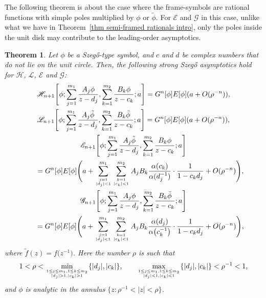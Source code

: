 \documentclass[pdftex]{sigma}
\numberwithin{equation}{section}
\newtheorem{Theorem}{Theorem}[section]
\newcommand{\al}{\alpha}
\newcommand{\di}{\displaystyle}
\begin{document}
	The following theorem is about the case where the frame-symbols are rational functions with simple poles multiplied by $\phi$ or $\tilde{\phi}$. For $\mathscr{E}$ and $\mathscr{G}$ in this case, unlike what we have in Theorem~\ref{thm semi-framed rationals intro}, only the poles inside the unit disk may contribute to the leading-order asymptotics.
	\begin{Theorem}\label{thm semi-framed rationals . phi intro} Let $\phi$ be a Szeg\H{o}-type symbol, and $c$ and $d$ be complex numbers that do not lie on the unit circle. Then, the following strong Szeg\H{o} asymptotics hold for $\mathscr{H}$, $\mathscr{L}$, $\mathscr{E}$ and $\mathscr{G}$:
		\begin{gather}
			\mathscr{H}_{n+1}\Bigg[\phi; \di \sum_{j=1}^{m_1} \di \frac{A_j \phi}{z-d_j}, \sum_{k=1}^{m_2} \di \frac{B_k\phi}{z-c_k};a\Bigg] = G^n[\phi] E[\phi] (a + O(\rho^{-n})),\label{asymp H rationals lin comb1}	
\\
			\mathscr{L}_{n+1}\Bigg[\phi; \di \sum_{j=1}^{m_1} \di \frac{A_j\tilde{\phi}}{z-d_j}, \sum_{k=1}^{m_2} \di \frac{B_k\tilde{\phi}}{z-c_k};a\Bigg] = G^n[\phi] E[\phi] (a + O(\rho^{-n})),	\nonumber
\\
			\mathscr{E}_{n+1}\Bigg[\phi; \di \sum_{j=1}^{m_1} \di \frac{A_j\tilde{\phi}}{z-d_j}, \sum_{k=1}^{m_2} \di \frac{B_k\phi}{z-c_k};a\Bigg] \nonumber
\\ \qquad= G^n[\phi] E[\phi] \Bigg( a + \sum^{m_1}_{j=1 \atop |d_j|<1 } \sum^{m_2}_{k=1 \atop |c_k|<1 } A_jB_k \frac{\al(c_k)}{\al(d_j^{-1})}\cdot \frac{1}{1-c_kd_j} +O(\rho^{-n}) \Bigg),	\nonumber
\\
			\mathscr{G}_{n+1}\Bigg[\phi; \di \sum_{j=1}^{m_1} \di \frac{A_j\phi}{z-d_j}, \sum_{k=1}^{m_2} \di \frac{B_k\tilde{\phi}}{z-c_k};a\Bigg] \nonumber
\\ \qquad= G^n[\phi] E[\phi] \Bigg( a + \sum^{m_1}_{j=1 \atop |d_j|<1 } \sum^{m_2}_{k=1 \atop |c_k|<1 } A_jB_k \frac{\al(d_j)}{\al\big(c_k^{-1}\big)}\cdot \frac{1}{1-c_kd_j} +O(\rho^{-n}) \Bigg),\label{asymp G rationals lin comb1}
		\end{gather}
		where $\tilde{f}(z) = f\big(z^{-1}\big)$. Here the number $\rho$ is such that
\[
1<\rho < \underset{1 \leq j \leq m_1, 1 \leq k \leq m_2 \atop |d_j|>1,|c_k|>1}{\min} \{|d_j|,|c_k|\}, \qquad \underset{1 \leq j \leq m_1, 1 \leq k \leq m_2 \atop |d_j|<1,|c_k|<1}{\max} \{|d_j|,|c_k|\}<\rho^{-1}<1,
\]
 and $\phi$ is analytic in the annulus $\big\{z\colon \rho^{-1}<|z|<\rho\big\}$.
	\end{Theorem}
	
\end{document}
